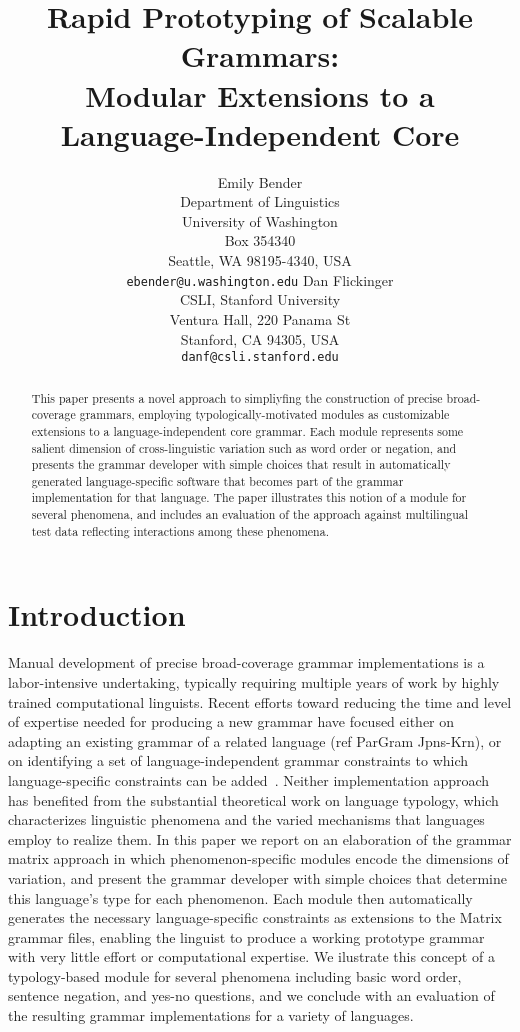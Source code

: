 \documentclass[11pt]{article}
\title{Rapid Prototyping of Scalable Grammars:\\
       Modular Extensions to a Language-Independent Core}
\author{Emily Bender\\
Department of Linguistics\\
University of Washington\\
Box 354340\\
Seattle, WA 98195-4340, USA\\
{\small {\tt ebender@u.washington.edu}}
\And
Dan Flickinger\\
CSLI, Stanford University\\
Ventura Hall, 220 Panama St\\
Stanford, CA 94305, USA\\
{\small {\tt danf@csli.stanford.edu}}
}
\date{}
\begin{document}
\maketitle
\begin{abstract}
This paper presents a novel approach to simpliyfing the construction of 
precise broad-coverage grammars, employing typologically-motivated modules
as customizable extensions to a language-independent core grammar.  Each
module represents some salient dimension of cross-linguistic variation such
as word order or negation, and presents the grammar developer with simple 
choices that result in automatically generated language-specific software 
that becomes part of the grammar implementation for that language.  The 
paper illustrates this notion of a module for several phenomena, and 
includes an evaluation of the approach against multilingual test data
reflecting interactions among these phenomena.
\end{abstract}

\section{Introduction}
Manual development of precise broad-coverage grammar implementations is a 
labor-intensive undertaking, typically requiring multiple years of work by 
highly trained computational linguists.  Recent efforts toward reducing the
time and level of expertise needed for producing a new grammar have
focused either on adapting an existing grammar of a related language 
(ref ParGram Jpns-Krn), or on identifying a set of language-independent 
grammar constraints to which language-specific constraints can be 
added~\cite{Ben:Fli:Oe:02}.  Neither implementation approach has benefited 
from the substantial theoretical work on language typology, which characterizes
linguistic phenomena and the varied mechanisms that languages employ to 
realize them.  In this paper we report on an elaboration of the grammar
matrix approach in which phenomenon-specific modules encode the dimensions
of variation, and present the grammar developer with simple choices that
determine this language's type for each phenomenon. Each module then
automatically generates the necessary language-specific constraints as
extensions to the Matrix grammar files, enabling the linguist to produce
a working prototype grammar with very little effort or computational
expertise.  We ilustrate this concept of a typology-based module for
several phenomena including basic word order, sentence negation, and
yes-no questions, and we conclude with an evaluation of the resulting
grammar implementations for a variety of languages.
\end{document}
